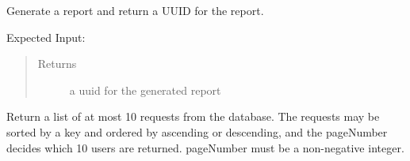 \documentclass[letterpaper,10pt,english]{sphinxmanual}
\begin{document}
\begin{fulllineitems}
\begin{fulllineitems}
\label{\detokenize{apidoc/utdesign_procurement:utdesign_procurement.apigateway.ApiGateway.reportGenerate}}
Generate a report and return a UUID for the report.

Expected Input:

\begin{sphinxVerbatim}[commandchars=\\\{\}]
          
           
          
        
          
     
     
\end{sphinxVerbatim}
\begin{quote}\begin{description}
\item[{Returns}] \leavevmode
a uuid for the generated report

\end{description}\end{quote}

\end{fulllineitems}


\begin{fulllineitems}
\label{\detokenize{apidoc/utdesign_procurement:utdesign_procurement.apigateway.ApiGateway.requestData}}
Return a list of at most 10 requests from the database. The requests may be
sorted by a key and ordered by ascending or descending, and the pageNumber
decides which 10 users are returned. pageNumber must be a non-negative integer.


\end{fulllineitems}
\end{fulllineitems}
\end{document}
